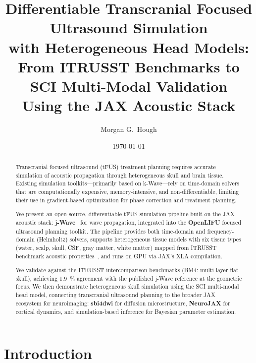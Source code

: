 \documentclass[11pt,a4paper]{article}\usepackage[]{graphicx}\usepackage[]{xcolor}
\title{Differentiable Transcranial Focused Ultrasound Simulation\\
  with Heterogeneous Head Models:\\
  From ITRUSST Benchmarks to SCI Multi-Modal Validation\\
  Using the JAX Acoustic Stack}
\author{Morgan G.\ Hough}
\date{\today}
\begin{document}
\maketitle




\begin{abstract}
Transcranial focused ultrasound (tFUS) treatment planning requires
accurate simulation of acoustic propagation through heterogeneous skull
and brain tissue. Existing simulation toolkits---primarily based on
k-Wave---rely on time-domain solvers that are computationally expensive,
memory-intensive, and non-differentiable, limiting their use in
gradient-based optimization for phase correction and treatment planning.

We present an open-source, differentiable tFUS simulation pipeline built
on the JAX acoustic stack: \textbf{j-Wave}~\citep{Stanziola2023jwave}
for wave propagation, integrated into the \textbf{OpenLIFU} focused
ultrasound planning toolkit. The pipeline provides both time-domain and
frequency-domain (Helmholtz) solvers, supports heterogeneous tissue
models with six tissue types (water, scalp, skull, CSF, gray matter,
white matter) mapped from ITRUSST benchmark acoustic
properties~\citep{Aubry2022benchmarks}, and runs on GPU via JAX's XLA
compilation.

We validate against the ITRUSST intercomparison benchmarks (BM4:
multi-layer flat skull), achieving \SI{1.9}{\percent} agreement with the
published j-Wave reference at the geometric focus. We then demonstrate
heterogeneous skull simulation using the SCI multi-modal head model,
connecting transcranial ultrasound planning to the broader JAX ecosystem
for neuroimaging: \textbf{sbi4dwi} for diffusion microstructure,
\textbf{NeuroJAX} for cortical dynamics, and simulation-based inference
for Bayesian parameter estimation.
\end{abstract}

\section{Introduction}
\end{document}
